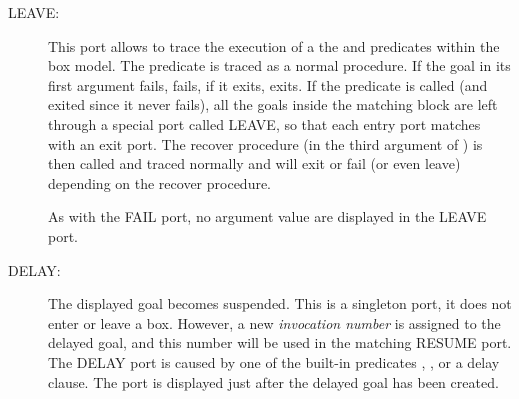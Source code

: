 \begin{description}
\item[LEAVE:]
This port allows to trace the execution of a the
 and
predicates within the box model.  The predicate
 is traced as
a normal procedure.  If the goal in its first argument fails,
 fails, if it
exits,  exits. 
If the predicate  is called (and exited since it
never fails), all the goals inside the matching block are left through
a special port called LEAVE, so that each entry port matches with an
exit port.  The recover procedure (in the third argument of
) is then
called and traced normally and
 will exit or
fail (or even leave) depending on the recover procedure.

As with the FAIL port, no argument value are displayed in the LEAVE port.

%
%

\item[DELAY:]
The displayed goal becomes suspended. This is a singleton port, it does
not enter or leave a box. However, a new {\it invocation number} is assigned
to the delayed goal, and this number will be used in the matching RESUME port.
The DELAY port is caused by one of the built-in predicates
,
,
or a delay clause.
The port is displayed just after the delayed goal has been created.


\end{description}

